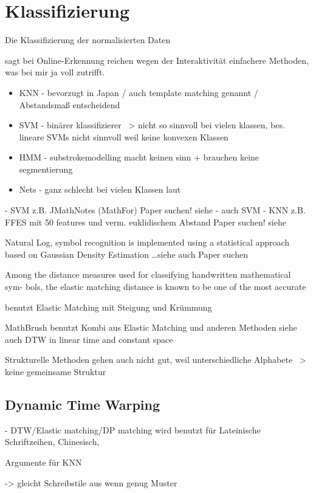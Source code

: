 
\section{Klassifizierung} %
\label{sec:klassifizierung}

Die Klassifizierung der normalisierten Daten 

\cite{Tappert:1990p10302} sagt bei Online-Erkennung reichen wegen der Interaktivität einfachere Methoden, was bei mir ja voll zutrifft.

\begin{itemize}
  \item KNN - bevorzugt in Japan \cite{Jaeger:2003p1097} / auch template matching genannt / Abstandsmaß entscheidend
  \item SVM - binärer klassifizierer ~> nicht so sinnvoll bei vielen klassen, bes. lineare SVMs nicht sinnvoll weil keine konvexen Klassen
  \item HMM - substrokemodelling macht keinen sinn + brauchen keine segmentierung
  \item Nets - ganz schlecht bei vielen Klassen laut \cite{Jaeger:2003p1097}
\end{itemize}
- SVM z.B. JMathNotes (MathFor) \TODO Paper suchen! siehe \cite{Vuong:2010p10279} - auch SVM \cite{Golubitsky:2009p2456}
- KNN z.B. FFES mit 50 features und verm. euklidischem Abstand \TODO Paper suchen! siehe \cite{Vuong:2010p10279}

Natural Log, symbol recognition is implemented using a statistical approach based on Gaussian Density Estimation \dots siehe auch \cite{Vuong:2010p10279} \TODO Paper suchen

Among the distance measures used for classifying handwritten mathematical sym- bols, the elastic matching distance is known to be one of the most accurate \cite{Golubitsky:2009p2433}
 
\cite{Vuong:2010p10279} benutzt Elastic Matching mit Steigung und Krümmung

MathBrush \cite{Labahn:2008p10301} benutzt Kombi aus Elastic Matching und anderen Methoden siehe auch \cite{MacLean:2010p9970} DTW in linear time and constant space

Strukturelle Methoden gehen auch nicht gut, weil unterschiedliche Alphabete ~> keine gemeinsame Struktur

\subsection[DTW]{Dynamic Time Warping}
\label{sub:dtw}

- DTW/Elastic matching/DP matching wird benutzt für Lateinische Schriftzeihen, Chinesisch, \cite{Tappert:1990p10302}


Argumente für KNN

-> gleicht Schreibstile aus wenn genug Muster

